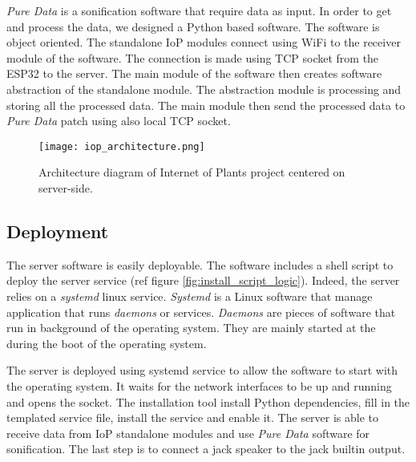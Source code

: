 \textit{Pure Data} is a sonification software that require data as input. In order to get and process the data, we designed a Python based software. %
The software is object oriented. The standalone IoP modules connect using WiFi to the receiver module
of the software. The connection is made using TCP socket from the ESP32 to the server.
The main module of the software then creates software abstraction of the standalone module.
The abstraction module is processing and storing all the processed data.
The main module then send the processed data to \textit{Pure Data} patch using also local TCP socket.

\begin{figure}[h]
    \centering
    \texttt{[image: iop\_architecture.png]}
    \caption{Architecture diagram of Internet of Plants project centered on server-side.}
    \vspace{0.1cm}
    \label{fig:server_architecture}
\end{figure}


\subsection{Deployment} %

The server software is easily deployable. The software includes a shell script to deploy the server service (ref figure \ref{fig:install_script_logic}).
Indeed, the server relies on a \textit{systemd} linux service. \textit{Systemd} \cite{Both2020} is a Linux software that manage application that runs \textit{daemons} or services.
\textit{Daemons} are pieces of software that run in background of the operating
system. They are mainly started at the during the boot of the operating system.


The server is deployed using systemd service to allow the software to start with the operating system.
It waits for the network interfaces to be up and running and opens the socket.
The installation tool install Python dependencies, fill in the templated service file,
install the service and enable it. The server is able to receive data from IoP standalone
modules and use \textit{Pure Data} software for sonification. The last step is to connect
a jack speaker to the jack builtin output.

